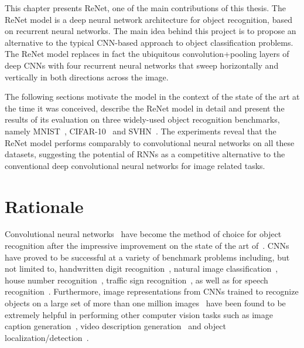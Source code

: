This chapter presents ReNet, one of the main contributions of this thesis.
The ReNet model is a deep neural network architecture for object recognition,
based on recurrent neural networks. The main idea behind this project is to
propose an alternative to the typical CNN-based approach to object
classification problems. The ReNet model replaces in fact the ubiquitous
convolution+pooling layers of deep CNNs with four recurrent neural networks
that sweep horizontally and vertically in both directions across the image.

The following sections motivate the model in the context of the state of the
art at the time it was conceived, describe the ReNet model in detail and
present the results of its evaluation on three widely-used object recognition
benchmarks, namely  MNIST~\citep{Lecun99objectrecognition},
CIFAR-10~\citep{KrizhevskyHinton2009} and SVHN~\citep{Netzer-wkshp-2011}. The
experiments reveal that the ReNet model performs comparably to convolutional
neural networks on all these datasets, suggesting the potential of RNNs as a
competitive alternative to the conventional deep convolutional neural networks
for image related tasks.


\section{Rationale}
Convolutional neural networks~\cite[CNN,][]{Fukushima80,LeCun89} have become the
method of choice for object recognition after the impressive improvement on the
state of the art of~\cite{Krizhevsky-2012}. CNNs have proved to be successful
at a variety of benchmark problems including, but not limited to, handwritten
digit recognition~\citep[see, e.g.,][]{Ciresan-2012}, natural image
classification~\citep[see, e.g.,][]{Lin2014,Simonyan2015,szegedy2014going},
house number recognition~\citep[see, e.g.,][]{Goodfellow+et+al-ICLR2014a},
traffic sign recognition~\citep[see, e.g.,][]{Ciresan-et-al-2012}, as well as
for speech recognition~\citep[see, e.g.,][]{Hamid2012, sainath2013,
toth2014combining}.  Furthermore, image representations from CNNs trained to
recognize objects on a large set of more than one million
images~\citep{Simonyan2015,szegedy2014going} have been found to be extremely
helpful in performing other computer vision tasks such as image caption
generation~\citep[see, e.g.,][]{Vinyals-et-al-arxiv2014,Xu-et-al-arxiv2015},
video description generation~\citep[see, e.g.,][]{Li2015} and object
localization/detection~\citep[see, e.g.,][]{Sermanet14}.

